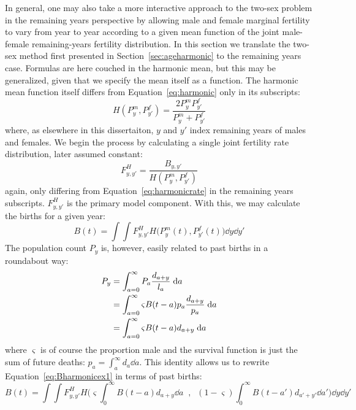  \FloatBarrier
In general, one may also take a more interactive approach to the two-sex
problem in the remaining years perspective by allowing male and female marginal
fertility to vary from year to year according to a given mean function of the
joint male-female remaining-years fertility distribution. In this section we
translate the two-sex method first presented in Section~\ref{sec:ageharmonic}
to the remaining years case. Formulas are here couched in the harmonic
mean, but this may be generalized, given that we specify the mean itself as
a function. The harmonic mean function itself differs from
Equation~\eqref{eq:harmonic} only in its subscripts:
\begin{equation}
H(P_y^m, P_{y'}^f) = \frac{2 P_y^m P_{y'}^f}{P_y^m + P_{y'}^f}
\end{equation}
where, as elsewhere in this dissertaiton, $y$ and $y'$ index remaining years of
males and females. We begin the process by calculating a single joint fertility rate distribution,
later assumed constant:
 \begin{equation}
 F_{y,y'}^H = \frac{B_{y,y'}}{H(P_y^m, P_{y'}^f)}
 \end{equation}
again, only differing from Equation~\eqref{eq:harmonicrate} in the remaining
years subscripts. $F_{y,y'}^H$ is the primary model component. With this, we may
calculate the births for a given year:
 \begin{equation}
 \label{eq:Bharmonicex1}
 B(t) = \int \int F_{y,y'}^H H\Big(P_{y}^m(t), P_{y'}^f(t)\Big) \dd y \dd
 y'
 \end{equation}
The population count $P_y$ is, however, easily related to past births in a
roundabout way:
\begin{align}
P_y &= \int_{a=0}^\infty P_a \frac{d_{a+y}}{l_a} \; \mathrm{d} a \notag \\
    &= \int_{a=0}^\infty \varsigma B(t-a)p_a \frac{d_{a+y}}{p_a} \; \mathrm{d} a \notag \\
    &= \int_{a=0}^\infty \varsigma B(t-a)d_{a+y} \; \mathrm{d} a
\end{align}
where $\varsigma$ is of course the proportion male and the survival function is
just the sum of future deaths: $p_a = \int _a^\infty d_a \dd a$. This identity
allows us to rewrite Equation~\eqref{eq:Bharmonicex1} in terms of past births:
 \begin{equation}
 \label{eq:Bharmonicex1}
 B(t) = \int \int F_{y,y'}^H H\Bigg(\varsigma \int _0^\infty B(t-a)d_{a+y}\dd
 a\;\;,\;\; (1-\varsigma) \int _0^\infty B(t-a')d_{a'+y'} \dd a'\Bigg) \dd y \dd
 y'
 \end{equation}
